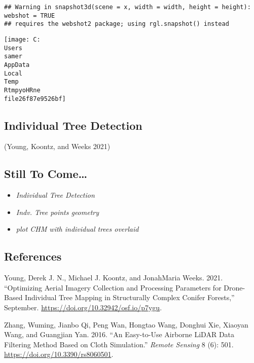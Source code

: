 \documentclass[
]{article}
\newlength{\cslhangindent}
\newlength{\cslentryspacingunit} %
\newenvironment{CSLReferences}[2] %
 {%
  \setlength{\parindent}{0pt}
  \ifodd #1
  \let\oldpar\par
  \def\par{\hangindent=\cslhangindent\oldpar}
  \fi
  \setlength{\parskip}{#2\cslentryspacingunit}
 }%
 {}
\begin{document}
\begin{verbatim}
## Warning in snapshot3d(scene = x, width = width, height = height): webshot = TRUE
## requires the webshot2 package; using rgl.snapshot() instead
\end{verbatim}

\texttt{[image: C:\\Users\\samer\\AppData\\Local\\Temp\\RtmpyoHRne\\file26f87e9526bf]}

\hypertarget{individual-tree-detection}{%
\subsection{Individual Tree Detection}\label{individual-tree-detection}}

(Young, Koontz, and Weeks 2021)

\hypertarget{still-to-come}{%
\subsection{Still To Come\ldots{}}\label{still-to-come}}

\begin{itemize}
\item
  \emph{Individual Tree Detection}
\item
  \emph{Indv. Tree points geometry}
\item
  \emph{plot CHM with individual trees overlaid}
\end{itemize}

\hypertarget{references}{%
\subsection*{References}\label{references}}

\hypertarget{refs}{}
\begin{CSLReferences}{1}{0}
\leavevmode{}%
Young, Derek J. N., Michael J. Koontz, and JonahMaria Weeks. 2021.
{``Optimizing Aerial Imagery Collection and Processing Parameters for
Drone-Based Individual Tree Mapping in Structurally Complex Conifer
Forests,''} September. \url{https://doi.org/10.32942/osf.io/p7ygu}.

\leavevmode{}%
Zhang, Wuming, Jianbo Qi, Peng Wan, Hongtao Wang, Donghui Xie, Xiaoyan
Wang, and Guangjian Yan. 2016. {``An Easy-to-Use Airborne LiDAR Data
Filtering Method Based on Cloth Simulation.''} \emph{Remote Sensing} 8
(6): 501. \url{https://doi.org/10.3390/rs8060501}.

\end{CSLReferences}
\end{document}
